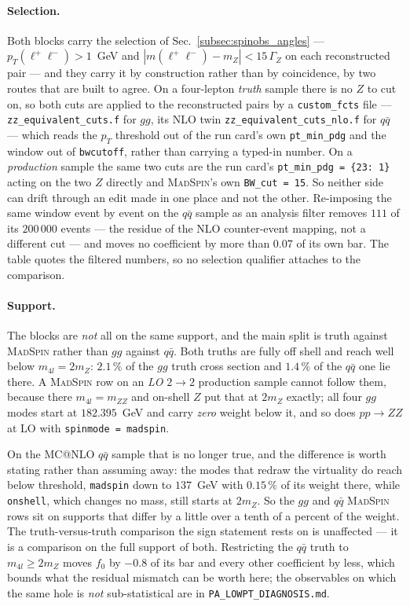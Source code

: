 \documentclass[a4paper,11pt]{article}
\providecommand{\ms}{{\textsc{MadSpin}}}
\providecommand{\code}[1]{\texttt{#1}}
\begin{document}
\paragraph{Selection.} Both blocks carry the selection of
Sec.~\ref{subsec:spinobs_angles} --- $p_T(\ell^+\ell^-)>1$~GeV and
$|m(\ell^+\ell^-)-m_Z|<15\,\Gamma_Z$ on each reconstructed pair --- and they
carry it by construction rather than by coincidence, by two routes that are
built to agree. On a four-lepton \emph{truth} sample there is no $Z$ to cut on,
so both cuts are applied to the reconstructed pairs by a \code{custom\_fcts}
file --- \code{zz\_equivalent\_cuts.f} for $gg$, its NLO twin
\code{zz\_equivalent\_cuts\_nlo.f} for $q\bar q$ --- which reads the $p_T$
threshold out of the run card's own \code{pt\_min\_pdg} and the window out of
\code{bwcutoff}, rather than carrying a typed-in number. On a \emph{production}
sample the same two cuts are the run card's \code{pt\_min\_pdg = \{23:\,1\}}
acting on the two $Z$ directly and \ms's own \code{BW\_cut = 15}. So neither
side can drift through an edit made in one place and not the other.
Re-imposing the same window event by event on the $q\bar q$ sample as an
analysis filter removes $111$ of its $200\,000$ events --- the residue of the
NLO counter-event mapping, not a different cut --- and moves no coefficient by
more than $0.07$ of its own bar. The table quotes the filtered numbers, so no
selection qualifier attaches to the comparison.

\paragraph{Support.} The blocks are \emph{not} all on the same support, and the
main split is truth against \ms{} rather than $gg$ against $q\bar q$. Both
truths are fully off shell and reach well below $m_{4l}=2m_Z$: $2.1\,\%$ of the
$gg$ truth cross section and $1.4\,\%$ of the $q\bar q$ one lie there. A \ms{}
row on an \emph{LO} $2\to2$ production sample cannot follow them, because there
$m_{4l}=m_{ZZ}$ and on-shell $Z$ put that at $2m_Z$ exactly; all four $gg$ modes
start at $182.395$~GeV and carry \emph{zero} weight below it, and so does
$pp\to ZZ$ at LO with \code{spinmode = madspin}.

On the MC@NLO $q\bar q$ sample that is no longer true, and the difference is
worth stating rather than assuming away: the modes that redraw the virtuality do
reach below threshold, \code{madspin} down to $137$~GeV with $0.15\,\%$ of its
weight there, while \code{onshell}, which changes no mass, still starts at
$2m_Z$. So the $gg$ and $q\bar q$ \ms{} rows sit on supports that differ by a
little over a tenth of a percent of the weight. The truth-versus-truth
comparison the sign statement rests on is unaffected --- it is a comparison on
the full support of both. Restricting the $q\bar q$ truth to $m_{4l}\ge2m_Z$
moves $f_0$ by $-0.8$ of its bar and every other coefficient by less, which
bounds what the residual mismatch can be worth here; the observables on which
the same hole is \emph{not} sub-statistical are in
\code{PA\_LOWPT\_DIAGNOSIS.md}.
\end{document}
